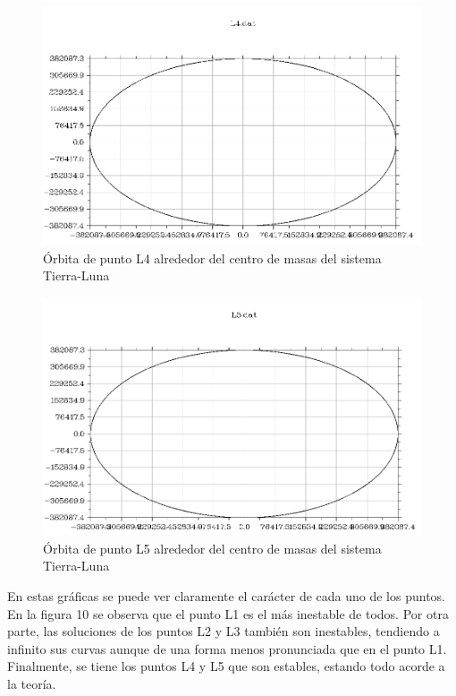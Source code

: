 \documentclass{article}
\begin{document}
	\begin{figure}[h!]
		\begin{center}
			\includegraphics[scale=0.5]{l4.png}
			\caption{Órbita de punto L4 alrededor del centro de masas del sistema Tierra-Luna}
		\end{center}
	\end{figure}

	\newpage

	\begin{figure}[h!]
		\begin{center}
			\includegraphics[scale=0.5]{l5.png}
			\caption{Órbita de punto L5 alrededor del centro de masas del sistema Tierra-Luna}
		\end{center}
	\end{figure}

	En estas gráficas se puede ver claramente el carácter de cada uno de los puntos. En la figura 10 se observa que el punto L1 es el más inestable de todos. Por otra parte, las soluciones de los puntos L2 y L3 también son inestables, tendiendo a infinito sus curvas aunque de una forma menos pronunciada que en el punto L1. Finalmente, se tiene los puntos L4 y L5 que son estables, estando todo acorde a la teoría.
	
\end{document}
